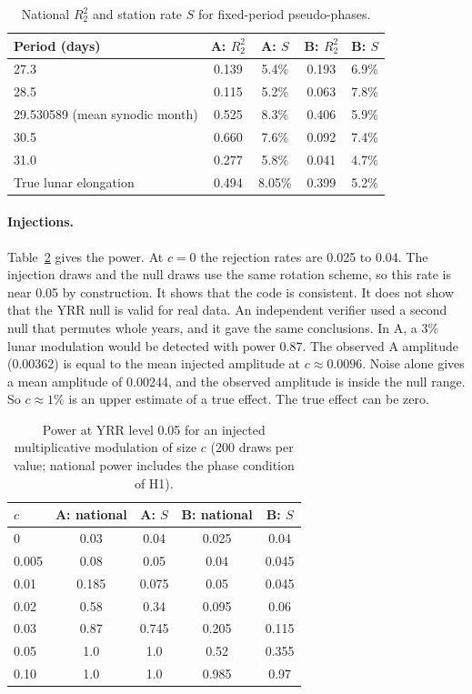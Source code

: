 \documentclass[11pt]{article}
\newcommand{\Rtwo}{R^2_2}
\begin{document}
\begin{table}[h]
\centering
\begin{tabular}{lcccc}
\toprule
Period (days) & A: $\Rtwo$ & A: $S$ & B: $\Rtwo$ & B: $S$\\
\midrule
27.3 & 0.139 & 5.4\% & 0.193 & 6.9\%\\
28.5 & 0.115 & 5.2\% & 0.063 & 7.8\%\\
29.530589 (mean synodic month) & 0.525 & 8.3\% & 0.406 & 5.9\%\\
30.5 & 0.660 & 7.6\% & 0.092 & 7.4\%\\
31.0 & 0.277 & 5.8\% & 0.041 & 4.7\%\\
True lunar elongation & 0.494 & 8.05\% & 0.399 & 5.2\%\\
\bottomrule
\end{tabular}
\caption{National $\Rtwo$ and station rate $S$ for fixed-period pseudo-phases.}
\label{tab:placebo}
\end{table}

\paragraph{Injections.} Table~\ref{tab:inj} gives the power. At $c=0$ the rejection rates are 0.025 to 0.04. The injection draws and the null draws use the same rotation scheme, so this rate is near 0.05 by construction. It shows that the code is consistent. It does not show that the YRR null is valid for real data. An independent verifier used a second null that permutes whole years, and it gave the same conclusions. In A, a 3\% lunar modulation would be detected with power 0.87. The observed A amplitude (0.00362) is equal to the mean injected amplitude at $c\approx0.0096$. Noise alone gives a mean amplitude of 0.00244, and the observed amplitude is inside the null range. So $c\approx1\%$ is an upper estimate of a true effect. The true effect can be zero.

\begin{table}[h]
\centering
\begin{tabular}{lcccc}
\toprule
$c$ & A: national & A: $S$ & B: national & B: $S$\\
\midrule
0 & 0.03 & 0.04 & 0.025 & 0.04\\
0.005 & 0.08 & 0.05 & 0.04 & 0.045\\
0.01 & 0.185 & 0.075 & 0.05 & 0.045\\
0.02 & 0.58 & 0.34 & 0.095 & 0.06\\
0.03 & 0.87 & 0.745 & 0.205 & 0.115\\
0.05 & 1.0 & 1.0 & 0.52 & 0.355\\
0.10 & 1.0 & 1.0 & 0.985 & 0.97\\
\bottomrule
\end{tabular}
\caption{Power at YRR level 0.05 for an injected multiplicative modulation of size $c$ (200 draws per value; national power includes the phase condition of H1).}
\label{tab:inj}
\end{table}
\end{document}
